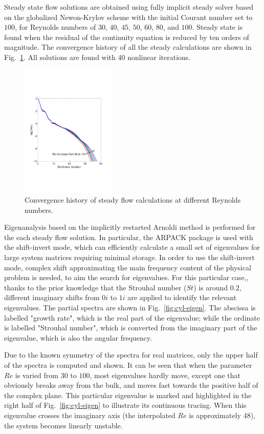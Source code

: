 \documentclass[journal,final]{new-aiaa}
\begin{document}
Steady state flow solutions are obtained using fully implicit
steady solver based on the globalized Newon-Krylov scheme with the
initial Courant number set to $100$, for
Reynolds numbers of $30$, $40$, $45$, $50$, $60$, $80$, and $100$.
Steady state is found when the residual of the continuity equation
is reduced by ten orders of magnitude. The convergence history of
all the steady calculations are shown in Fig.~\ref{fig:cyl-std}.
All solutions are found with 40 nonlinear iterations.


\begin{figure}[htb]
	\centering   
	\includegraphics[width=0.4\textwidth]{cyl-std-conv.pdf}
	\caption{Convergence history of steady flow calculations
		at different Reynolds numbers.}
	\label{fig:cyl-std}
\end{figure}

Eigenanalysis based on the implicitly restarted Arnoldi method
is performed for the each steady flow solution. In particular,
the ARPACK package is used with the shift-invert mode, which can
efficiently calculate a small set of eigenvalues for large system
matrices requiring minimal storage. In order to use the shift-invert
mode, complex shift approximating the main frequency content of the
physical problem is needed, to aim the search for eigenvalues.
For this particular case,, thanks to the prior knowledge that
the Strouhal number ($St$) is around $0.2$, different imaginary
shifts from $0i$ to $1i$ are applied to identify the relevant
eigenvalues. The partial spectra
are shown in Fig.~\ref{fig:cyl-eigen}. The abscissa is labelled
"growth rate", which is the real part of the eigenvalue; while
the ordinate is labelled "Strouhal number", which is converted
from the imaginary part of the eigenvalue, which is also the
angular frequency.

Due to the known symmetry of the spectra for real matrices,
only the upper half of the spectra is computed and shown.
It can be seen that when the parameter $Re$ is varied from
$30$ to $100$, most eigenvalues hardly move, except one
that obviously breaks away from the bulk, and moves fast
towards the positive half of the complex plane. This
particular eigenvalue is marked and highlighted in the
right half of Fig.~\ref{fig:cyl-eigen} to illustrate its
continuous tracing. When this eigenvalue crosses the
imaginary axis (the interpolated $Re$ is approximately
48), the system becomes linearly unstable.
\end{document}

